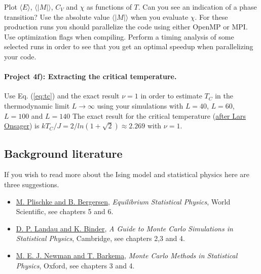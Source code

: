 \documentclass[%
oneside,                 %
final,                   %
10pt]{article}
\begin{document}
Plot $\langle E\rangle$,
$\langle \vert M\vert\rangle$, $C_V$ and $\chi$ as functions of $T$. Can
you see an indication of a phase transition?  Use the absolute value
$\langle \vert M\vert\rangle$ when you evaluate $\chi$.  For these production runs you should
parallelize the code using either OpenMP or MPI. Use optimization flags when compiling. Perform a timing analysis of some selected runs in order to see that you get an optimal speedup when parallelizing your code. 

\paragraph{Project 4f): Extracting the critical temperature.}
Use Eq. (\ref{eq:tc}) and the exact result
$\nu=1$ in order to estimate $T_C$ in the thermodynamic limit 
$L\rightarrow \infty$
using your simulations with $L=40$, $L=60$, $L=100$ and $L=140$
The exact result for the critical temperature (\href{{http://journals.aps.org/pr/abstract/10.1103/PhysRev.65.117}}{after Lars Onsager}) is
$kT_C/J=2/ln(1+\sqrt{2})\approx 2.269$ with $\nu=1$.


\subsection*{Background literature}

If you wish to read more about the Ising model and statistical physics here are three suggestions.

\begin{itemize}
  \item \href{{http://www.worldscientific.com/worldscibooks/10.1142/5660}}{M. Plischke and B. Bergersen}, \emph{Equilibrium Statistical Physics}, World Scientific, see chapters 5 and 6.

  \item \href{{http://www.cambridge.org/no/academic/subjects/physics/computational-science-and-modelling/guide-monte-carlo-simulations-statistical-physics-4th-edition?format=HB}}{D. P. Landau and K. Binder}, \emph{A Guide to Monte Carlo Simulations in Statistical Physics}, Cambridge, see chapters 2,3 and 4.

  \item \href{{https://global.oup.com/academic/product/monte-carlo-methods-in-statistical-physics-9780198517979?cc=no&lang=en&}}{M. E. J. Newman and T. Barkema}, \emph{Monte Carlo Methods in Statistical Physics}, Oxford, see chapters 3 and 4.
\end{itemize}
\end{document}
